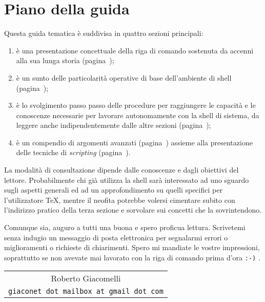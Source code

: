 
%
%
%
\chapter{Piano della guida}

Questa guida tematica è suddivisa in quattro sezioni principali:
\begin{enumerate}
\item è una presentazione concettuale della riga di comando sostenuta da accenni
alla sua lunga storia (pagina~\pageref{chapConsole});

\item è un sunto delle particolarità operative di base dell'ambiente di shell
(pagina~\pageref{chapShell});

\item è lo svolgimento passo passo delle procedure per raggiungere le capacità e
le conoscenze necessarie per lavorare autonomamente con la shell di sistema, da
leggere anche indipendentemente dalle altre sezioni (pagina~\pageref{chapEser});

\item è un compendio di argomenti avanzati (pagina~\pageref{chapAvanz})
assieme alla presentazione delle tecniche di \emph{scripting}
(pagina~\pageref{chapScripting}).
\end{enumerate}

La modalità di consultazione dipende dalle conoscenze e dagli obiettivi del
lettore. Probabilmente chi già utilizza la shell sarà interessato ad uno sguardo
sugli aspetti generali ed ad un approfondimento su quelli specifici per
l'utilizzatore \TeX, mentre il neofita potrebbe volersi cimentare subito con
l'indirizzo pratico della terza sezione e sorvolare sui concetti che la
sovrintendono.

Comunque sia, auguro a tutti una buona e spero proficua lettura. Scrivetemi
senza indugio un messaggio di posta elettronica per segnalarmi errori o
miglioramenti o richieste di chiarimenti. Spero mi mandiate le vostre
impressioni, soprattutto se non avevate mai lavorato con la riga di comando
prima d'ora \texttt{:-)} .

\medskip
\hfill\begin{tabular}{c}
Roberto Giacomelli\\
\texttt{giaconet dot mailbox at gmail dot com}\\
\end{tabular}
